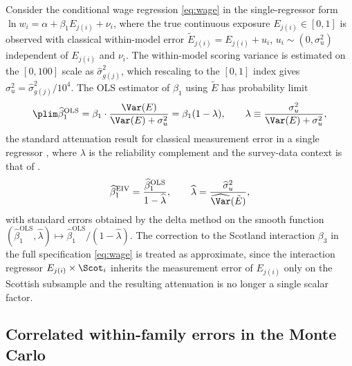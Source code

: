 Consider the conditional wage regression \cref{eq:wage} in the single-regressor form $\ln w_i = \alpha + \beta_1 E_{j(i)} + \nu_i$, where the true continuous exposure $E_{j(i)} \in [0,1]$ is observed with classical within-model error $\tilde{E}_{j(i)} = E_{j(i)} + u_i$, $u_i \sim (0, \sigma^2_u)$ independent of $E_{j(i)}$ and $\nu_i$. The within-model scoring variance is estimated on the $[0,100]$ scale as $\widehat{\sigma}^2_{g(j)}$, which rescaling to the $[0,1]$ index gives $\sigma^2_u = \widehat{\sigma}^2_{g(j)} / 10^4$. The OLS estimator of $\beta_1$ using $\tilde{E}$ has probability limit
\begin{equation}\label{eq:A9}
\plim \widehat{\beta}^{\mathrm{OLS}}_1
= \beta_1 \cdot \frac{\Var(E)}{\Var(E) + \sigma^2_u}
= \beta_1 (1 - \lambda),
\qquad
\lambda \equiv \frac{\sigma^2_u}{\Var(E) + \sigma^2_u},
\end{equation}
the standard attenuation result for classical measurement error in a single regressor \citep[][ch.~4]{wooldridge2010}, where $\lambda$ is the reliability complement and the survey-data context is that of \citet{bound1991}.
\begin{equation}\label{eq:A10}
\widehat{\beta}^{\mathrm{EIV}}_1
= \frac{\widehat{\beta}^{\mathrm{OLS}}_1}{1 - \widehat{\lambda}},
\qquad
\widehat{\lambda}
= \frac{\widehat{\sigma}^2_u}{\widehat{\Var}(\tilde{E})},
\end{equation}
with standard errors obtained by the delta method on the smooth function $(\widehat{\beta}^{\mathrm{OLS}}_1, \widehat{\lambda}) \mapsto \widehat{\beta}^{\mathrm{OLS}}_1 / (1 - \widehat{\lambda})$. The correction to the Scotland interaction $\beta_3$ in the full specification \cref{eq:wage} is treated as approximate, since the interaction regressor $E_{j(i)} \times \Scot_i$ inherits the measurement error of $E_{j(i)}$ only on the Scottish subsample and the resulting attenuation is no longer a single scalar factor.

\subsection{Correlated within-family errors in the Monte Carlo}

